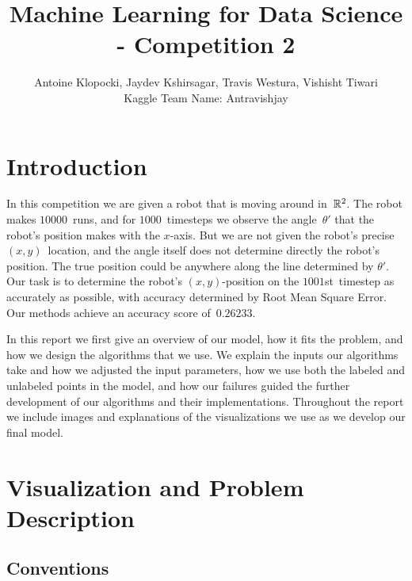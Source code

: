\documentclass[twoside]{article}
\title{Machine Learning for Data Science - Competition 2}
\author{Antoine Klopocki, Jaydev Kshirsagar, Travis Westura, Vishisht Tiwari\\Kaggle Team Name: Antravishjay}
\date{\vspace{-5ex}} %
\begin{document}
\maketitle
\thispagestyle{empty}

\section{Introduction}\label{sec:introduction}

In this competition we are given a robot that is moving around in~$\mathbb{R}^2$.
The robot makes $\num{10000}$~runs, and for $\num{1000}$~timesteps we observe the angle~$\theta'$ that the robot's position makes with the $x$-axis.
But we are not given the robot's precise ${(x, y)}$~location, and the angle itself does not determine directly the robot's position.
The true position could be anywhere along the line determined by $\theta'$.
Our task is to determine the robot's ${(x, y)}$-position on the $\num{1001}$st~timestep as accurately as possible, with accuracy determined by Root Mean Square Error.
Our methods achieve an accuracy score of~$\bm{0.26233}$.

In this report we first give an overview of our model, how it fits the problem, and how we design the algorithms that we use.
We explain the inputs our algorithms take and how we adjusted the input parameters, how we use both the labeled and unlabeled points in the model, and how our failures guided the further development of our algorithms and their implementations.
Throughout the report we include images and explanations of the visualizations we use as we develop our final model.

\section{Visualization and Problem Description}\label{sec:vis-and-prob-desc}

\subsection{Conventions}\label{sec:conventions}
\end{document}
